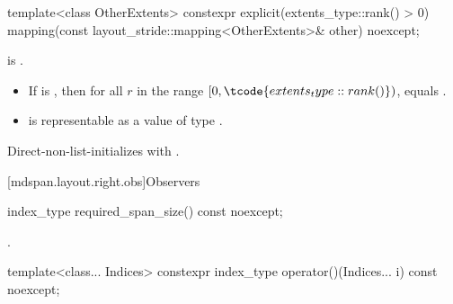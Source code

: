 %
\begin{itemdecl}
template<class OtherExtents>
 constexpr explicit(extents_type::rank() > 0)
    mapping(const layout_stride::mapping<OtherExtents>& other) noexcept;
\end{itemdecl}

\begin{itemdescr}
\pnum
\constraints
{} is .

\pnum
\expects
\begin{itemize}
\item
If  is ,
then for all $r$ in the range $[0, \tcode{extents_type::rank()})$,
 equals
.
\item
{} is representable as
a value of type .
\end{itemize}

\pnum
\effects
Direct-non-list-initializes  with .
\end{itemdescr}

[mdspan.layout.right.obs]{Observers}

%
\begin{itemdecl}
index_type required_span_size() const noexcept;
\end{itemdecl}

\begin{itemdescr}
\pnum
\returns
{}.
\end{itemdescr}

%
\begin{itemdecl}
template<class... Indices>
  constexpr index_type operator()(Indices... i) const noexcept;
\end{itemdecl}

